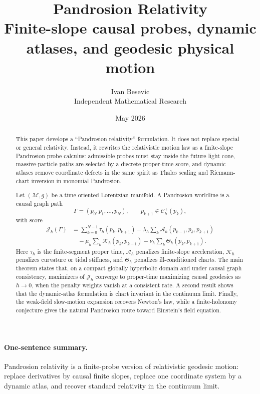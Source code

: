 \documentclass[11pt]{article}
\title{Pandrosion Relativity\\[3pt]
\large Finite-slope causal probes, dynamic atlases, and geodesic physical motion}
\author{Ivan Besevic\\Independent Mathematical Research}
\date{May 2026}
\newcommand{\M}{\mathcal M}
\newcommand{\A}{\mathcal A}
\newcommand{\Cset}{\mathcal C}
\newcommand{\J}{\mathcal J}
\newcommand{\K}{\mathcal K}
\begin{document}
\maketitle

\begin{abstract}
This paper develops a ``Pandrosion relativity'' formulation.  It does not
replace special or general relativity.  Instead, it rewrites the relativistic
motion law as a finite-slope Pandrosion probe calculus: admissible probes must
stay inside the future light cone, massive-particle paths are selected by a
discrete proper-time score, and dynamic atlases remove coordinate defects in
the same spirit as Thales scaling and Riemann-chart inversion in monomial
Pandrosion.

Let \((\M,g)\) be a time-oriented Lorentzian manifold.  A Pandrosion worldline
is a causal graph path
\[
        \Gamma=(p_0,p_1,\ldots,p_N),
        \qquad p_{k+1}\in\Cset_h^+(p_k),
\]
with score
\[
        \begin{aligned}
        \J_h(\Gamma)
        &=
        \sum_{k=0}^{N-1}\tau_h(p_k,p_{k+1})
        -
        \lambda_h\sum_k\A_h(p_{k-1},p_k,p_{k+1})
\\
        &\quad
        -
        \mu_h\sum_k\K_h(p_k,p_{k+1})
        -
        \nu_h\sum_k\Theta_h(p_k,p_{k+1}).
        \end{aligned}
\]
Here \(\tau_h\) is the finite-segment proper time, \(\A_h\) penalizes
finite-slope acceleration, \(\K_h\) penalizes curvature or tidal stiffness, and
\(\Theta_h\) penalizes ill-conditioned charts.  The main theorem states that,
on a compact globally hyperbolic domain and under causal graph consistency,
maximizers of \(\J_h\) converge to proper-time maximizing causal geodesics as
\(h\to0\), when the penalty weights vanish at a consistent rate.  A second
result shows that the dynamic-atlas formulation is chart invariant in the
continuum limit.  Finally, the weak-field slow-motion expansion recovers
Newton's law, while a finite-holonomy conjecture gives the natural Pandrosion
route toward Einstein's field equation.
\end{abstract}

\paragraph{One-sentence summary.}
Pandrosion relativity is a finite-probe version of relativistic geodesic
motion: replace derivatives by causal finite slopes, replace one coordinate
system by a dynamic atlas, and recover standard relativity in the continuum
limit.
\end{document}
